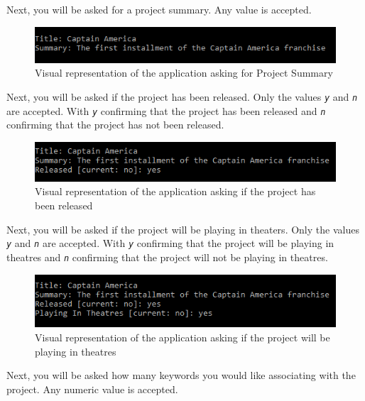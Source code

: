 \documentclass[
  english,
  a4paper,
,tablecaptionabove
]{scrartcl}
\begin{document}
Next, you will be asked for a project summary. Any value is accepted.

\begin{figure}
\centering
\includegraphics{images/user-guide/maintenance-mode/add-project-summary.png}
\caption{Visual representation of the application asking for Project
Summary}
\end{figure}

Next, you will be asked if the project has been released. Only the
values \emph{\texttt{y}} and \emph{\texttt{n}} are accepted. With
\emph{\texttt{y}} confirming that the project has been released and
\emph{\texttt{n}} confirming that the project has not been released.

\begin{figure}
\centering
\includegraphics{images/user-guide/maintenance-mode/add-project-released.png}
\caption{Visual representation of the application asking if the project
has been released}
\end{figure}

Next, you will be asked if the project will be playing in theaters. Only
the values \emph{\texttt{y}} and \emph{\texttt{n}} are accepted. With
\emph{\texttt{y}} confirming that the project will be playing in
theatres and \emph{\texttt{n}} confirming that the project will not be
playing in theatres.

\begin{figure}
\centering
\includegraphics{images/user-guide/maintenance-mode/add-project-theatres.png}
\caption{Visual representation of the application asking if the project
will be playing in theatres}
\end{figure}

Next, you will be asked how many keywords you would like associating
with the project. Any numeric value is accepted.
\end{document}
